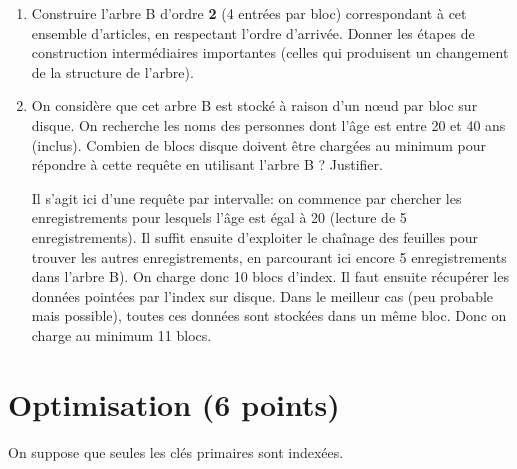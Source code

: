 \begin{enumerate}

\item Construire l'arbre B d'ordre \textbf{2} (4 entrées par bloc)
correspondant à cet ensemble d'articles, en respectant l'ordre d'arrivée. 
Donner les étapes de construction intermédiaires importantes (celles qui produisent 
un changement de la structure de l'arbre).


\item On considère que cet arbre B  est stocké à raison d'un n{\oe}ud par bloc sur disque. On recherche les noms des personnes dont l'âge est entre 20 et 40 ans (inclus). 
Combien de blocs disque doivent être chargées au minimum pour répondre à cette requête en utilisant l'arbre B ? Justifier. 


\begin{solution}
Il s'agit ici d'une requête par intervalle: on commence par chercher les enregistrements pour lesquels l'âge est égal à 20 (lecture de 5 enregistrements). Il suffit ensuite d'exploiter le chaînage des feuilles pour trouver les autres enregistrements, en parcourant ici encore 5 enregistrements dans l'arbre B). On charge donc 10 
blocs d'index. Il faut ensuite récupérer les données pointées par l'index sur disque. Dans le meilleur cas (peu probable mais possible), toutes ces données sont stockées dans un même 
bloc. Donc on charge au minimum 11 blocs. 
\end{solution}

\end{enumerate}


\section{Optimisation (6 points)}

On suppose que seules les clés primaires sont indexées.

